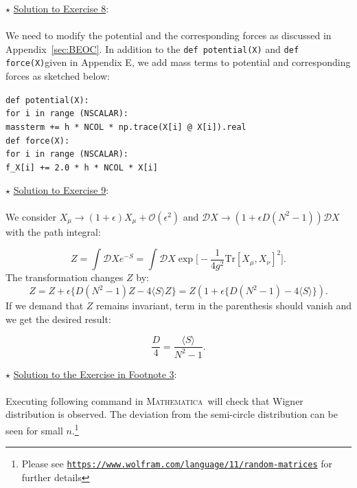 \documentclass[letter,11pt]{article}
\newcommand{\MA}{\textsc{Mathematica}}
\newcommand\tab[1][1cm]{\hspace*{#1}}
\begin{document}
\noindent $\star$ \ul{Solution to Exercise 8}:
\\  \\ 
We need to modify the potential and the corresponding forces as discussed in Appendix~\ref{sec:BEOC}. In addition to the \verb"def potential(X)" 
and \verb"def force(X)"given in Appendix E, we add mass terms to potential and corresponding forces as sketched below: 

\begin{footnotesize} 

\begin{mdframed}[backgroundcolor=blue!3] 
 \verb"def potential(X):" \\
 \tab	\verb"for i in range (NSCALAR):" \\ 
    \tab     \tab	\verb"massterm += h * NCOL * np.trace(X[i] @ X[i]).real" \\
    
\vspace{5mm} 
\noindent
\verb"def force(X):" \\ 
\tab	\verb"for i in range (NSCALAR):"  \\ 
       \tab  \tab 	\verb"f_X[i] += 2.0 * h * NCOL * X[i] " 
\end{mdframed}
\end{footnotesize} 

\noindent $\star$ \ul{Solution to Exercise 9}:
\\ \\ 
We consider $ X_{\mu} \to (1 + \epsilon) X_{\mu} + \mathcal{O}(\epsilon^2)$
and $\mathcal{D}X \to (1 + \epsilon D (N^2-1))\mathcal{D}X$ with the path integral:

\begin{equation}
	Z = \int \mathcal{D}X e^{-S} = \int \mathcal{D}X \exp\Big[-\frac{1}{4g^2} \mbox{Tr} [X_\mu,X_\nu]^2\Big].
\end{equation}
The transformation changes $Z$ by:
\begin{equation}
	Z = Z + \epsilon \Big\{ D(N^2 -1)Z - 4\langle S \rangle Z  \Big\} = Z ( 1 + \epsilon \Big\{ D(N^2 -1) - 4\langle S \rangle   \Big\}).
\end{equation}
If we demand that $Z$ remains invariant, term in the parenthesis should vanish and we get the desired result:

\begin{equation}
	\frac{D}{4} = \frac{\langle S \rangle}{N^2 - 1}. 
\end{equation}  
      
\vspace{3mm}     
\noindent $\star$ \ul{Solution to the Exercise in Footnote 3}:
\\  \\
Executing following command in \MA~will check that Wigner distribution is 
observed. The deviation from the semi-circle distribution can be seen for small 
$n$.\footnote{Please see \texttt{\href{https://www.wolfram.com/language/11/random-matrices}{https://www.wolfram.com/language/11/random-matrices}} for further details}
\end{document}
